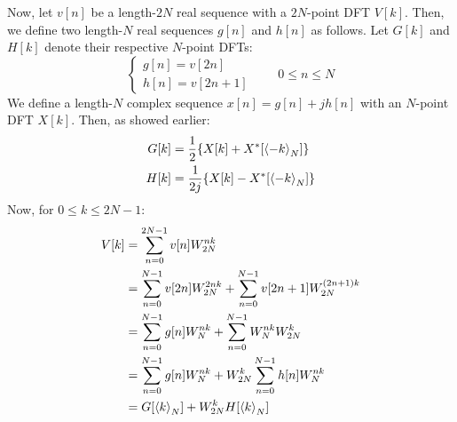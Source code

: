 \documentclass[../../main/main.tex]{subfiles}
\begin{document}
Now, let \( v[n] \) be a length-\( 2N \) real sequence with a \( 2N \)-point DFT \( V[k] \). Then, we define two length-\( N \) real sequences \( g[n] \) and \( h[n] \) as follows. Let \( G[k] \) and \( H[k] \) denote their respective \( N \)-point DFTs:
\begin{equation}
    \begin{cases}
        g[n] = v[2n]    \\
        h[n] = v[2n+1]
    \end{cases}
    \qquad
    0 \le n \le N
    \label{eq:L13_S09_3}
\end{equation}
We define a length-\( N \) complex sequence \( x[n] = g[n] + jh[n] \) with an \( N \)-point DFT \( X[k] \). Then, as showed earlier:
\begin{align}
    G[k] &= \frac{1}{2} \qty{X[k] + X^{*}[\expval{-k}_{N}]} \\
    H[k] &= \frac{1}{2j} \qty{X[k] - X^{*}[\expval{-k}_{N}]}
\end{align}
Now, for \( 0 \le k \le 2N-1 \):
\begin{align}
    V[k]
    &=
        \sum_{n=0}^{2N-1} v[n] W_{2N}^{nk}  \nonumber   \\
    &=
        \sum_{n=0}^{N-1} v[2n] W_{2N}^{2nk} + \sum_{n=0}^{N-1} v[2n+1] W_{2N}^{(2n+1)k} \nonumber   \\
    &=
        \sum_{n=0}^{N-1} g[n] W_{N}^{nk} + \sum_{n=0}^{N-1} W_{N}^{nk} W_{2N}^{k}   \nonumber   \\
    &=
        \sum_{n=0}^{N-1} g[n] W_{N}^{nk} + W_{2N}^{k} \sum_{n=0}^{N-1} h[n] W_{N}^{nk}  \nonumber   \\
    &=
        G[\expval{k}_{N}] + W_{2N}^{k} H[\expval{k}_{N}]
\end{align}
\end{document}
